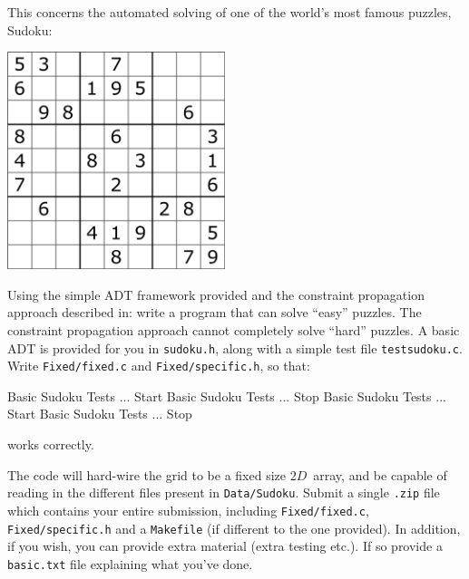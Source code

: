 
This concerns the automated solving of one of the world's most famous puzzles, Sudoku:
\begin{center}
\includegraphics[width=2.5in]{../Pictures/wiki_sudoku.png}
\end{center}



\begin{exercise}
\label{ex:sudoku1}

Using the simple ADT framework provided and the constraint propagation
approach described in:
write a program that can solve ``easy'' puzzles.
The constraint propagation approach cannot completely solve ``hard''
puzzles.  A basic ADT is provided for you
in \verb^sudoku.h^, along with a simple test file
\verb^testsudoku.c^.
Write \verb^Fixed/fixed.c^
and \verb^Fixed/specific.h^, so that:

{\small
\begin{terminaloutput}
Basic Sudoku Tests ... Start
Basic Sudoku Tests ... Stop
Basic Sudoku Tests ... Start
Basic Sudoku Tests ... Stop
\end{terminaloutput}
}
\noindent works correctly. 

\noindent The code will hard-wire the grid to be a fixed size $2D$~array,
and be capable of reading in the different files present in \verb^Data/Sudoku^.
Submit a single \verb^.zip^ file which contains your entire submission,
including \verb^Fixed/fixed.c^, \verb^Fixed/specific.h^ and a \verb^Makefile^ (if
different to the one provided). In addition, if you wish, you can provide extra material
(extra testing etc.). If so provide a \verb^basic.txt^ file explaining what you've done.
\end{exercise}

